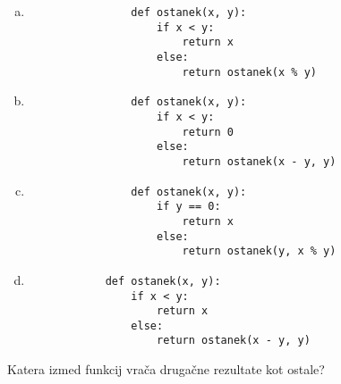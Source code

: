 \documentclass[arhiv, 10pt]{../izpit}
\begin{document}
        \begin{multicols}{2}
        \begin{enumerate}[(a)]
\item 
                \begin{verbatim}
                def ostanek(x, y):
                    if x < y:
                        return x
                    else:
                        return ostanek(x % y)
                \end{verbatim}
            
\item 
                \begin{verbatim}
                def ostanek(x, y):
                    if x < y:
                        return 0
                    else:
                        return ostanek(x - y, y)
                \end{verbatim}
            
\item 
                \begin{verbatim}
                def ostanek(x, y):
                    if y == 0:
                        return x
                    else:
                        return ostanek(y, x % y)
                \end{verbatim}
            
\item 
            \begin{verbatim}
            def ostanek(x, y):
                if x < y:
                    return x
                else:
                    return ostanek(x - y, y)
            \end{verbatim}
        
\end{enumerate}

        \end{multicols}
    
        \naloga*
        
        Katera izmed funkcij vrača drugačne rezultate kot ostale?
    
\end{document}

